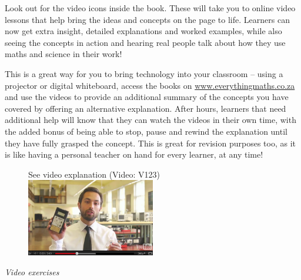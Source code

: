 {\Large

Look out for the video icons inside the book. These will take you to online video lessons that help bring the ideas and concepts on the page to life. Learners can now get extra insight, detailed
explanations and worked examples, while also seeing the concepts in action and hearing real people talk about how they use maths and science in their work!  \par

This is a great way for you to bring technology into your classroom – using a projector or digital whiteboard, access the books on \underline{www.everythingmaths.co.za} and use the videos to provide an additional summary of the concepts you have covered by offering an alternative explanation. After hours, learners that need additional help will know that they can watch the videos in their own time, with the added bonus of being able to stop, pause and rewind the explanation until they have fully grasped the concept. This is great for revision purposes too, as it is like having a personal teacher on hand for every learner, at any time! \par
\begin{figure}[h]
\begin{center}
See video explanation  (Video: V123)\\
\includegraphics[width=0.5\textwidth]{../title_images/veritasiumvideo.png}
\end{center}
\end{figure}

}


\vspace{0.5cm}
{\normalfont\sffamily\fontsize{22}\normalfont\itshape Video exercises} \par

